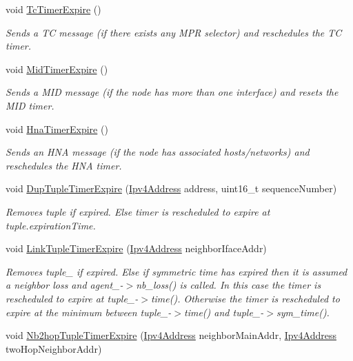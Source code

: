 \begin{DoxyCompactItemize}
void \hyperlink{classns3_1_1olsr_1_1RoutingProtocol_ad9443857cbc18e1fe48848106c40c96f}{Tc\+Timer\+Expire} ()
\begin{DoxyCompactList}\small\item\em Sends a TC message (if there exists any M\+PR selector) and reschedules the TC timer. \end{DoxyCompactList}\item 
void \hyperlink{classns3_1_1olsr_1_1RoutingProtocol_adb532d5890ea3954e8ab73a625d53e66}{Mid\+Timer\+Expire} ()
\begin{DoxyCompactList}\small\item\em Sends a M\+ID message (if the node has more than one interface) and resets the M\+ID timer. \end{DoxyCompactList}\item 
void \hyperlink{classns3_1_1olsr_1_1RoutingProtocol_a6ef2a79ac872935b84a3f1d54316456d}{Hna\+Timer\+Expire} ()
\begin{DoxyCompactList}\small\item\em Sends an H\+NA message (if the node has associated hosts/networks) and reschedules the H\+NA timer. \end{DoxyCompactList}\item 
void \hyperlink{classns3_1_1olsr_1_1RoutingProtocol_a78f4aad4a5597ab60fa913e917eabbec}{Dup\+Tuple\+Timer\+Expire} (\hyperlink{classns3_1_1Ipv4Address}{Ipv4\+Address} address, uint16\+\_\+t sequence\+Number)
\begin{DoxyCompactList}\small\item\em Removes tuple if expired. Else timer is rescheduled to expire at tuple.\+expiration\+Time. \end{DoxyCompactList}\item 
void \hyperlink{classns3_1_1olsr_1_1RoutingProtocol_a468cf0d2f46d44f105dff8dffdabcb67}{Link\+Tuple\+Timer\+Expire} (\hyperlink{classns3_1_1Ipv4Address}{Ipv4\+Address} neighbor\+Iface\+Addr)
\begin{DoxyCompactList}\small\item\em Removes tuple\+\_\+ if expired. Else if symmetric time has expired then it is assumed a neighbor loss and agent\+\_\+-\/$>$nb\+\_\+loss() is called. In this case the timer is rescheduled to expire at tuple\+\_\+-\/$>$time(). Otherwise the timer is rescheduled to expire at the minimum between tuple\+\_\+-\/$>$time() and tuple\+\_\+-\/$>$sym\+\_\+time(). \end{DoxyCompactList}\item 
void \hyperlink{classns3_1_1olsr_1_1RoutingProtocol_a5e71d702e1b560c4645139912da27002}{Nb2hop\+Tuple\+Timer\+Expire} (\hyperlink{classns3_1_1Ipv4Address}{Ipv4\+Address} neighbor\+Main\+Addr, \hyperlink{classns3_1_1Ipv4Address}{Ipv4\+Address} two\+Hop\+Neighbor\+Addr)

\end{DoxyCompactItemize}
